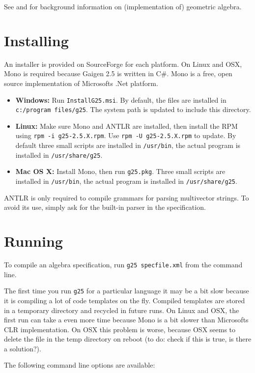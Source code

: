 \documentclass[10pt, a4paper]{article}
\begin{document}
See \cite{GA4CS} and \cite{fontijnePhD} for background information on (implementation of) geometric algebra.


\section{Installing}

An installer is provided on SourceForge for each platform.
On Linux and OSX, Mono is required because Gaigen 2.5 is written in C\#.
Mono is a free, open source implementation of Microsofts .Net platform.

\begin{itemize}
\item {\bf Windows: } Run {\tt InstallG25.msi}. By default, the files are installed in {\tt c:/program files/g25}.
The system path is updated to include this directory.
\item {\bf Linux: } Make sure Mono and ANTLR are installed, then install the RPM using 
{\tt rpm -i g25-2.5.X.rpm}. Use {\tt rpm -U g25-2.5.X.rpm} to update.
By default three small scripts are installed in {\tt /usr/bin}, the actual program is installed in {\tt /usr/share/g25}.
\item {\bf Mac OS X:} Install Mono, then run {\tt g25.pkg}. Three small scripts are installed in {\tt /usr/bin}, the actual 
program is installed in {\tt /usr/share/g25}.
\end{itemize}

ANTLR is only required to compile grammars for parsing multivector strings.
To avoid its use, simply ask for the built-in parser in the specification.

\section{Running}

To compile an algebra specification, run {\tt g25 specfile.xml} from the command line.
	
The first time you run {\tt g25} for a particular language 
it may be a bit slow because it is compiling a lot of code templates on the fly. 
Compiled templates are stored in a temporary 
directory and recycled in future runs.
On Linux and OSX, the first run can take a even more time because Mono is a bit
slower than Microsofts CLR implementation.
On OSX this problem is worse, because OSX seems to delete the file in the temp directory
on reboot (to do: check if this is true, is there a solution?).

	
The following command line options are available:
\end{document}
